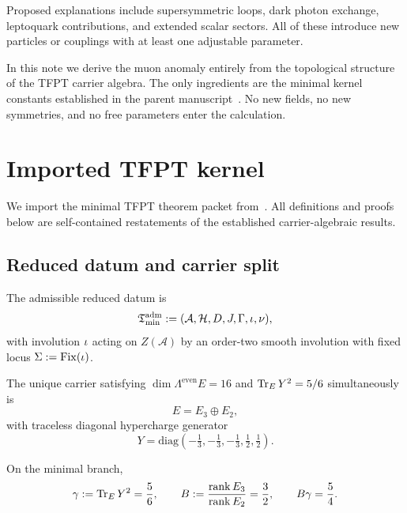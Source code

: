 Proposed explanations include supersymmetric loops, dark photon exchange,
leptoquark contributions, and extended scalar sectors. All of these introduce
new particles or couplings with at least one adjustable parameter.

In this note we derive the muon anomaly entirely from the topological
structure of the TFPT carrier algebra. The only ingredients are the
minimal kernel constants established in the parent manuscript~\cite{TFPT31}.
No new fields, no new symmetries, and no free parameters enter the
calculation.

\section{Imported TFPT kernel}\label{sec:kernel}

We import the minimal TFPT theorem packet from~\cite{TFPT31,TFPTkernel}.
All definitions and proofs below are self-contained restatements of the
established carrier-algebraic results.

\subsection{Reduced datum and carrier split}

\begin{definition}\label{def:reduced-datum}
The admissible reduced datum is
\[
\mathfrak T_{\mathrm{min}}^{\mathrm{adm}}:=(\mathcal A,\mathcal H,D,J,\Gamma,\iota,\nu),
\]
with involution $\iota$ acting on $Z(\mathcal A)$ by an order-two smooth
involution with fixed locus $\Sigma:=\operatorname{Fix}(\iota)$.
\end{definition}

\begin{theorem}
\label{thm:minimal-carrier}
The unique carrier satisfying $\dim\Lambda^{\mathrm{even}}E=16$ and
$\operatorname{Tr}_EY^2=5/6$ simultaneously is
\[
E=E_3\oplus E_2,
\]
with traceless diagonal hypercharge generator
\[
Y=\mathrm{diag}\!\left(-\tfrac13,-\tfrac13,-\tfrac13,\tfrac12,\tfrac12\right).
\]
\end{theorem}

\begin{corollary}\label{cor:carrier-invariants}
On the minimal branch,
\begin{equation}\label{eq:carrier-invariants}
\gamma:=\operatorname{Tr}_EY^2=\frac56,
\qquad
B:=\frac{\operatorname{rank} E_3}{\operatorname{rank} E_2}=\frac32,
\qquad
B\gamma=\frac54.
\end{equation}
\end{corollary}

